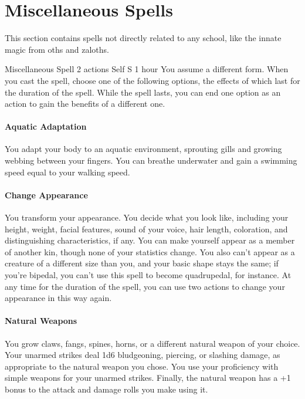 \section{Miscellaneous Spells}
This section contains spells not directly related to any school, like the innate magic from oths and zaloths.

    {Miscellaneous Spell}
    {2 actions}
    {Self}
    {S}
    {1 hour}
    You assume a different form.
    When you cast the spell, choose one of the following options, the effects of which last for the duration of the spell.
    While the spell lasts, you can end one option as an action to gain the benefits of a different one.

    \paragraph{Aquatic Adaptation}
        You adapt your body to an aquatic environment, sprouting gills and growing webbing between your fingers.
        You can breathe underwater and gain a swimming speed equal to your walking speed.

    \paragraph{Change Appearance}
        You transform your appearance.
        You decide what you look like, including your height, weight, facial features, sound of your voice, hair length, coloration, and distinguishing characteristics, if any.
        You can make yourself appear as a member of another kin, though none of your statistics change.
        You also can't appear as a creature of a different size than you, and your basic shape stays the same; if you're bipedal, you can't use this spell to become quadrupedal, for instance.
        At any time for the duration of the spell, you can use two actions to change your appearance in this way again.

    \paragraph{Natural Weapons}
        You grow claws, fangs, spines, horns, or a different natural weapon of your choice.
        Your unarmed strikes deal 1d6 bludgeoning, piercing, or slashing damage, as appropriate to the natural weapon you chose.
        You use your proficiency with simple weapons for your unarmed strikes.
        Finally, the natural weapon has a +1 bonus to the attack and damage rolls you make using it.

